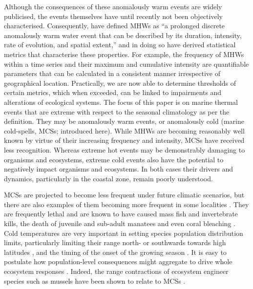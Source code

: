 \documentclass[a4paper,10pt,review]{elsarticle}
\begin{document}
Although the consequences of these anomalously warm events are widely publicised, the events themselves have until recently not been objectively characterised. Consequently, \citet{Hobday2016} have defined MHWs as ``a prolonged discrete anomalously warm water event that can be described by its duration, intensity, rate of evolution, and spatial extent,'' and in doing so have derived statistical metrics that characterise these properties. For example, the frequency of MHWs within a time series and their maximum and cumulative intensity are quantifiable parameters that can be calculated in a consistent manner irrespective of geographical location. Practically, we are now able to determine thresholds of certain metrics, which when exceeded, can be linked to impairments and alterations of ecological systems. The focus of this paper is on marine thermal events that are extreme with respect to the seasonal climatology as per the \citet{Hobday2016} definition. They may be anomalously warm events, or anomalously cold (marine cold-spells, MCSs; introduced here). While MHWs are becoming reasonably well known by virtue of their increasing frequency and intensity, MCSs have received less recognition. Whereas extreme hot events may be demonstrably damaging to organisms and ecosystems, extreme cold events also have the potential to negatively impact organisms and ecosystems. In both cases their drivers and dynamics, particularly in the coastal zone, remain poorly understood.

MCSs are projected to become less frequent under future climatic scenarios, but there are also examples of them becoming more frequent in some localities \citep[e.g.][]{Gershunov2008, Matthes2015}. They are frequently lethal \citep{Woodward1987} and are known to have caused mass fish \citep{Gunter1941, Gunter1951, Holt1983} and invertebrate \citep{Gunter1951, Crisp1964} kills, the death of juvenile and sub-adult manatees \citep{OShea1985, Marsh1986} and even coral bleaching \citep{Lirman2011}. Cold temperatures are very important in setting species population distribution limits, particularly limiting their range north- or southwards towards high latitudes \citep{Firth2011}, and the timing of the onset of the growing season \citep{Jentsch2007}. It is easy to postulate how population-level consequences might aggregate to drive whole ecosystem responses \citep[e.g.][]{Kreyling2008, Rehage2016}. Indeed, the range contractions of ecosystem engineer species such as mussels have been shown to relate to MCSs \citep{Firth2011, Firth2015}.
\end{document}
